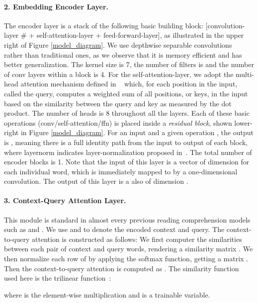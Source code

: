 \documentclass{article} \usepackage{iclr2018_conference,times}
\begin{document}
\paragraph{2. Embedding Encoder Layer.} The encoder layer is a stack of the following basic building block: 
[convolution-layer  \# + self-attention-layer + feed-forward-layer],
as illustrated in the upper right of Figure \ref{model_diagram}. We use depthwise separable convolutions ~\citep{Chollet16a} ~\citep{kaiser2017depthwise} rather than traditional ones, as we observe that it is memory efficient and has better generalization. The kernel size is 7, the number of filters is  and the number of conv layers within a block is 4.
For the self-attention-layer, we adopt the multi-head attention mechanism defined in ~\citep{VaswaniSPUJGKP17} which, for each position in the input, called the query, computes a weighted sum of all positions, or keys, in the input based on the similarity between the query and key as measured by the dot product. The number of heads is 8 throughout all the layers. 
 Each of these basic operations (conv/self-attention/ffn) is placed inside a \textit{residual block}, shown lower-right in Figure \ref{model_diagram}.  For an input  and a given operation , the output is , meaning there is a full identity path from the input to output of each block, where layernorm indicates layer-normalization proposed in~\citep{BaKH16}. The total number of encoder blocks is 1. Note that the input of this layer is a vector of dimension  for each individual word, which is immediately mapped to  by a one-dimensional convolution. The output of this layer is a also of dimension .

\paragraph{3. Context-Query Attention Layer.} This module is standard in almost every previous reading comprehension models such as \cite{WeissenbornWS17} and \cite{ChenFWB17}. We use  and  to denote the encoded context and query.  The context-to-query attention is constructed as follows: We first computer the similarities between each pair of context and query words, rendering a similarity matrix 
. We then normalize each row of  by applying the softmax function, getting a matrix . Then the context-to-query attention is computed as 
. The similarity function used here is the trilinear function~\citep{SeoKFH16}:

where  is the element-wise multiplication and  is a trainable variable.
\end{document}
